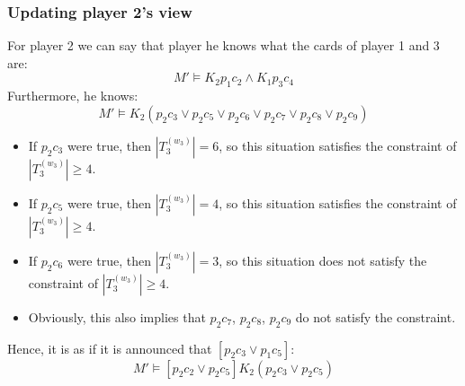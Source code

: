 \documentclass[a4paper,10pt]{article}
\begin{document}
\subsubsection{Updating player 2's view}
For player 2 we can say that player he knows what the cards of player 1 and 3 are: 
\begin{equation*}
M' \models K_2 p_1c_2 \wedge K_1p_3c_4 
\end{equation*}
Furthermore, he knows:
\begin{equation*}
 M' \models K_2(p_2 c_3 \vee p_2 c_5 \vee p_2 c_6 \vee p_2 c_7 \vee p_2 c_8 \vee p_2 c_9)
\end{equation*}
\begin{itemize}
 \item If $p_2 c_3$ were true, then $|T_3^{(w_3)}| = 6$, so this situation satisfies the constraint of $|T_3^{(w_3)}| \geq 4$.
 \item If $p_2 c_5$ were true, then $|T_3^{(w_3)}| = 4$, so this situation satisfies the constraint of $|T_3^{(w_3)}| \geq 4$.
 \item If $p_2 c_6$ were true, then $|T_3^{(w_3)}| = 3$, so this situation does not satisfy the constraint of $|T_3^{(w_3)}| \geq 4$.
 \item Obviously, this also implies that $p_2 c_7$, $p_2 c_8$, $p_2 c_9$ do not satisfy the constraint.   
\end{itemize}
Hence, it is as if it is announced that $[p_2 c_3 \vee p_1 c_5]$:
\begin{equation}
M'\models [p_2 c_2 \vee p_2 c_5] K_2 (p_2 c_3 \vee p_2 c_5)
\end{equation}



\begin{comment}
\begin{figure}[!h]
 \centering
\begin{tikzpicture}
  \node [mystate] (a) at (0,0) {$\bullet$};
  \node [mystate] (b) at (5,0) {$\bullet$};
  \draw (a) node[below] {$\neg p, q, \neg r$};
  \draw (b) node[below] {$p, q, r$};
  \draw (a) node[above] {$w_1$};
  \draw (b) node[above] {$w_2$};
  \draw (a) to node[below] {$b$} (b);
\end{tikzpicture}
\caption{Simple world}
\label{fig:wrld}
\end{figure}
\end{comment}
\end{document}
